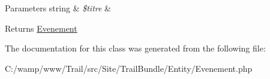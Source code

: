 \begin{DoxyParams}[1]{Parameters}
string & {\em \$titre} & \\
\hline
\end{DoxyParams}
\begin{DoxyReturn}{Returns}
\hyperlink{class_site_1_1_trail_bundle_1_1_entity_1_1_evenement}{Evenement} 
\end{DoxyReturn}


The documentation for this class was generated from the following file\+:\begin{DoxyCompactItemize}
\item 
C\+:/wamp/www/\+Trail/src/\+Site/\+Trail\+Bundle/\+Entity/Evenement.\+php\end{DoxyCompactItemize}
